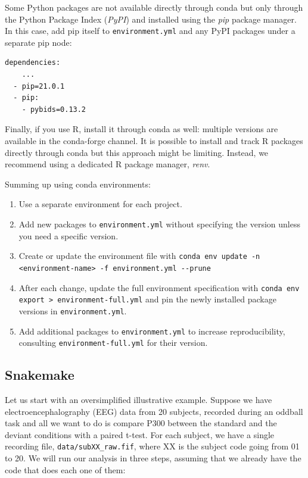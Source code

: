 \documentclass[a4paper,man,floatsintext,natbib]{apa6}
\begin{document}
Some Python packages are not available directly through conda but only through the Python Package Index (\emph{PyPI}) and installed using the \emph{pip} package manager. In this case, add pip itself to \verb|environment.yml| and any PyPI packages under a separate pip node:

\begin{verbatim}
dependencies:
    ...
  - pip=21.0.1
  - pip:
    - pybids=0.13.2
\end{verbatim}

Finally, if you use R, install it through conda as well: multiple versions are available in the conda-forge channel. It is possible to install and track R packages directly through conda but this approach might be limiting. Instead, we recommend using a dedicated R package manager, \emph{renv}.

Summing up using conda environments:

\begin{enumerate}
    \item Use a separate environment for each project.
    \item Add new packages to \verb|environment.yml| without specifying the version unless you need a specific version.
    \item Create or update the environment file with \verb|conda env update -n <environment-name> -f environment.yml --prune|
    \item After each change, update the full environment specification with \verb|conda env export > environment-full.yml| and pin the newly installed package versions in \verb|environment.yml|.
    \item Add additional packages to \verb|environment.yml| to increase reproducibility, consulting \verb|environment-full.yml| for their version.
\end{enumerate}

\subsection{Snakemake}
\label{section:snakemake}
Let us start with an oversimplified illustrative example. Suppose we have electroencephalography (EEG) data from 20 subjects, recorded during an oddball task and all we want to do is compare P300 between the standard and the deviant conditions with a paired t-test. For each subject, we have a single recording file, \verb|data/subXX_raw.fif|, where XX is the subject code going from 01 to 20. We will run our analysis in three steps, assuming that we already have the code that does each one of them:
\end{document}
